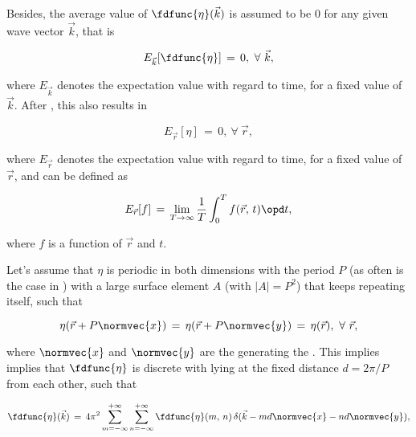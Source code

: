 {Besides, the average value of $\fdfunc{\eta}(\vec{k})$ is assumed to be 0 for any given wave vector $\vec{k}$, that is

\begin{equation} \label{eq:zero_expectation_value_reciprocal_space}
E_{\vec{k}}[\fdfunc{\eta}] \,=\, 0,\ \forall\ \vec{k},
\end{equation}

where $E_{\vec{k}}$ denotes the expectation value with regard to time, for a fixed value of $\vec{k}$. After , this also results in 

\begin{equation} \label{eq:zero_expectation_value_real_space_with_regard_to_t}
E_{\vec{r}}[\eta] \,=\, 0,\ \forall\ \vec{r},
\end{equation}

where $E_{\vec{r}}$ denotes the expectation value with regard to time, for a fixed value of $\vec{r}$, and can be defined as

\begin{equation} \label{eq:expectation_value_with_regard_to_t_definition}
E_{\vec{r}}[f] \,=\, \lim_{T\to\infty}\frac{1}{T}\int_0^T f(\vec{r},\,t)\opd t,
\end{equation}

where $f$ is a function of $\vec{r}$ and $t$.

Let's assume that $\eta$ is periodic in both dimensions with the period $P$ (as often is the case in ) with a large surface element $A$ (with \mbox{$|A| = P^2$}) that keeps repeating itself, such that

\begin{equation} \label{eq:water_surface_periodicity}
\eta(\vec{r}+P\normvec{x}) \,=\, \eta(\vec{r}+P\normvec{y}) \,=\, \eta(\vec{r}),\ \forall\ \vec{r},
\end{equation}

where $\normvec{x}$ and $\normvec{y}$ are the  generating the . This implies implies that $\fdfunc{\eta}$ is discrete with  lying at the fixed distance $d = 2\pi/P$ from each other, such that

\begin{equation} \label{eq:fd_eta_series}
\fdfunc{\eta}(\vec{k}) \,=\, 4\pi^2\sum_{m=-\infty}^{+\infty}\sum_{n=-\infty}^{+\infty} \fdfunc{\eta}(m,\,n)\,\delta(\vec{k} - md\normvec{x} - nd\normvec{y}),
\end{equation}

}

